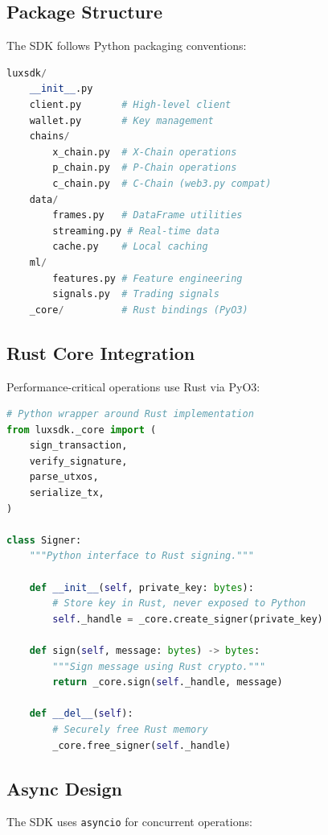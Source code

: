 \documentclass[11pt,twocolumn]{article}
\begin{document}
\subsection{Package Structure}

The SDK follows Python packaging conventions:

\begin{lstlisting}[language=Python,caption=Package Structure]
luxsdk/
    __init__.py
    client.py       # High-level client
    wallet.py       # Key management
    chains/
        x_chain.py  # X-Chain operations
        p_chain.py  # P-Chain operations
        c_chain.py  # C-Chain (web3.py compat)
    data/
        frames.py   # DataFrame utilities
        streaming.py # Real-time data
        cache.py    # Local caching
    ml/
        features.py # Feature engineering
        signals.py  # Trading signals
    _core/          # Rust bindings (PyO3)
\end{lstlisting}

\subsection{Rust Core Integration}

Performance-critical operations use Rust via PyO3:

\begin{lstlisting}[language=Python,caption=Rust Bindings]
# Python wrapper around Rust implementation
from luxsdk._core import (
    sign_transaction,
    verify_signature,
    parse_utxos,
    serialize_tx,
)

class Signer:
    """Python interface to Rust signing."""

    def __init__(self, private_key: bytes):
        # Store key in Rust, never exposed to Python
        self._handle = _core.create_signer(private_key)

    def sign(self, message: bytes) -> bytes:
        """Sign message using Rust crypto."""
        return _core.sign(self._handle, message)

    def __del__(self):
        # Securely free Rust memory
        _core.free_signer(self._handle)
\end{lstlisting}

\subsection{Async Design}

The SDK uses \texttt{asyncio} for concurrent operations:
\end{document}
